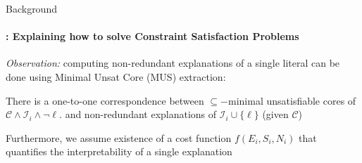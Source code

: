 \documentclass{beamer}
\newcommand\m[1]{\ensuremath{\mathcal{#1}}\xspace}
\renewcommand\emph[1]{{\color{vuborange}#1}}
\newcommand\Iend{\m{I_{\mathit{end}}}}
\begin{document}
	\begin{frame}{Background}
		\framesubtitle{\cite{bogaerts2020step}: Explaining how to solve Constraint Satisfaction Problems}
%	

		 \textit{Observation:} computing non-redundant explanations of a single literal can be done using Minimal Unsat Core (MUS) extraction:\pause
		\begin{theorem}
			\small
			There is a one-to-one correspondence between $\subseteq-$minimal unsatisfiable cores of $\m{C} \wedge \m{I}_i \wedge \lnot \ell$. and non-redundant explanations of $\m{I}_i \cup \{\ell\}$ (given $\m{C}$)
		\end{theorem}\pause
Furthermore, we assume existence of a \emph{cost function} $f(E_i,S_i,N_i)$ that quantifies the interpretability of a single explanation
	
	\end{frame}

%
\end{document}
